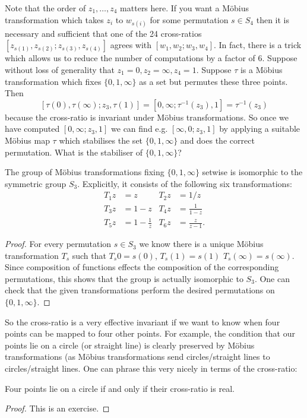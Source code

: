 \documentclass[12pt]{article}
\begin{document}
Note that the order of $z_1,\ldots,z_4$ matters here. If you want a M\"obius transformation which takes $z_i$ to $w_{s(i)}$ for some permutation $s\in S_4$ then it is necessary and sufficient that one of the 24 cross-ratios $[z_{s(1)},z_{s(2)};z_{s(3)},z_{s(4)}]$ agrees with $[w_1,w_2;w_3,w_4]$. In fact, there is a trick which allows us to reduce the number of computations by a factor of 6. Suppose without loss of generality that $z_1=0,z_2=\infty,z_4=1$. Suppose $\tau$ is a M\"obius transformation which fixes $\{0,1,\infty\}$ as a set but permutes these three points. Then
\[[\tau(0),\tau(\infty);z_3,\tau(1)]=[0,\infty;\tau^{-1}(z_3),1]=\tau^{-1}(z_3)\]
because the cross-ratio is invariant under M\"obius transformations. So once we have computed $[0,\infty;z_3,1]$ we can find e.g. $[\infty,0;z_3,1]$ by applying a suitable M\"obius map $\tau$ which stabilises the set $\{0,1,\infty\}$ and does the correct permutation. What is the stabiliser of $\{0,1,\infty\}$?

\begin{lma}
  The group of M\"obius transformations fixing $\{0,1,\infty\}$ setwise is isomorphic to the symmetric group $S_3$. Explicitly, it consists of the following six transformations:
  \begin{align*}
    T_1z&=z&T_2z&=1/z\\
    T_3z&=1-z&T_4z&=\frac{1}{1-z}\\
    T_5z&=1-\frac{1}{z}&T_6z&=\frac{z}{z-1}.
  \end{align*}
\end{lma}
\begin{proof}
  For every permutation $s\in S_3$ we know there is a unique M\"obius transformation $T_s$ such that $T_s0=s(0)$, $T_s(1)=s(1)$ $T_s(\infty)=s(\infty)$. Since composition of functions effects the composition of the corresponding permutations, this shows that the group is actually isomorphic to $S_3$. One can check that the given transformations perform the desired permutations on $\{0,1,\infty\}$.
\end{proof}

So the cross-ratio is a very effective invariant if we want to know when four points can be mapped to four other points. For example, the condition that our points lie on a circle (or straight line) is clearly preserved by M\"obius transformations (as M\"obius transformations send circles/straight lines to circles/straight lines. One can phrase this very nicely in terms of the cross-ratio:

\begin{cor}
  Four points lie on a circle if and only if their cross-ratio is real.
\end{cor}
\begin{proof}
  This is an exercise.
\end{proof}
\end{document}
